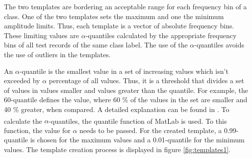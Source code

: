 
The two templates are bordering an acceptable range for each frequency bin of a class. One of the two templates sets the maximum and one the minimum amplitude limits. Thus, each template is a vector of absolute frequency bins. These limiting values are $\alpha$-quantiles calculated by the appropriate frequency bins of all test records of the same class label. The use of the $\alpha$-quantiles avoids the use of outliers in the templates.

An $\alpha$-quantile is the smallest value in a set of increasing values which isn't exceeded by $\alpha$ percentage of all values. Thus, it is a threshold that divides a set of values in values smaller and values greater than the quantile. For example, the 60-quantile defines the value, where 60 \% of the values in the set are smaller and 40 \% greater, when compared. A detailed explanation can be found in \autocite{Hedderich:2012}. To calculate the $\alpha$-quantiles, the quantile function of MatLab\textsuperscript{\textregistered} is used. To this function, the value for $\alpha$ needs to be passed. For the created template, a 0.99-quantile is chosen for the maximum values and a 0.01-quantile for the minimum values. The template creation process is displayed in figure \ref{fig:templates1}.

%


